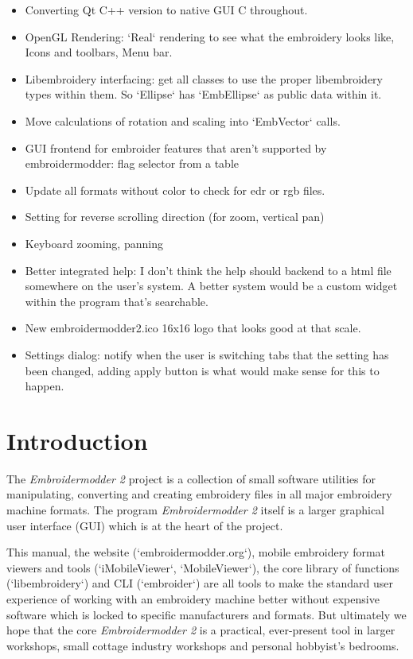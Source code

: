 \documentclass[11pt]{report}
\begin{document}
\begin{itemize}
  \item Converting Qt C++ version to native GUI C throughout.
  \item OpenGL Rendering: `Real` rendering to see what the embroidery looks like, Icons and toolbars, Menu bar.
  \item Libembroidery interfacing: get all classes to use the proper libembroidery types within them. So `Ellipse` has `EmbEllipse` as public data within it.
  \item Move calculations of rotation and scaling into `EmbVector` calls.
  \item GUI frontend for embroider features that aren't supported by embroidermodder: flag selector from a table
  \item Update all formats without color to check for edr or rgb files.
  \item Setting for reverse scrolling direction (for zoom, vertical pan)
  \item Keyboard zooming, panning
  \item Better integrated help: I don't think the help should backend to a html file somewhere on the user's system. A better system would be a custom widget within the program that's searchable.
  \item New embroidermodder2.ico 16x16 logo that looks good at that scale.
  \item Settings dialog: notify when the user is switching tabs that the setting has been changed, adding apply button is what would make sense for this to happen.
\end{itemize}

\chapter{Introduction}

The \emph{Embroidermodder 2} project is a collection of small software utilities for
manipulating, converting and creating embroidery files in all major embroidery
machine formats. The program \textit{Embroidermodder 2} itself is a larger graphical
user interface (GUI) which is at the heart of the project.

This manual, the website (`embroidermodder.org`), mobile embroidery format viewers
and tools (`iMobileViewer`, `MobileViewer`), the core library of functions
(`libembroidery`) and CLI (`embroider`) are all tools to make the standard
user experience of working with an embroidery machine better without expensive
software which is locked to specific manufacturers and formats. But ultimately
we hope that the core \textit{Embroidermodder 2} is a practical, ever-present tool in
larger workshops, small cottage industry workshops and personal hobbyist's
bedrooms.
\end{document}
